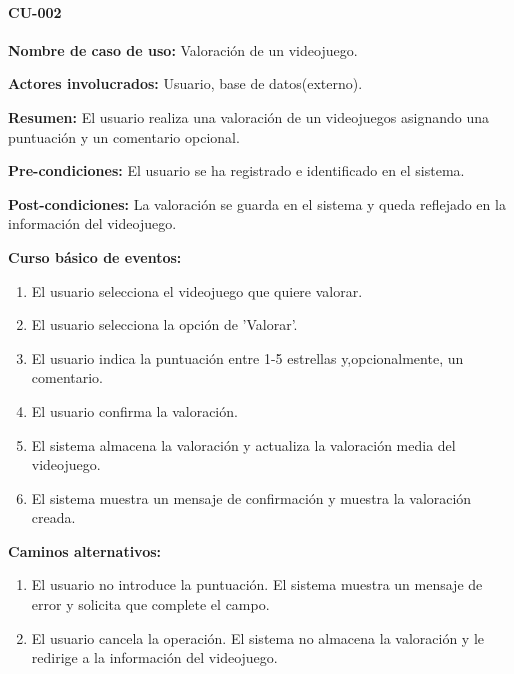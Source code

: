 \paragraph{CU-002}
\begin{description}
    \item \textbf{Nombre de caso de uso:} Valoración de un videojuego.
    \item \textbf{Actores involucrados:} Usuario, base de datos(externo).
    \item \textbf{Resumen:} El usuario realiza una valoración de un videojuegos asignando una puntuación 
    y un comentario opcional.
    \item \textbf{Pre-condiciones:} El usuario se ha registrado e identificado en el sistema.
    \item \textbf{Post-condiciones:} La valoración se guarda en el sistema y queda reflejado en la información 
    del videojuego.
    \item \textbf{Curso básico de eventos:} 
    \begin{enumerate}
            \item El usuario selecciona el videojuego que quiere valorar.
            \item El usuario selecciona la opción de 'Valorar'.
            \item El usuario indica la puntuación entre 1-5 estrellas y,opcionalmente, un comentario.
            \item El usuario confirma la valoración.
            \item El sistema almacena la valoración y actualiza la valoración media del videojuego.
            \item El sistema muestra un mensaje de confirmación y muestra la valoración creada.

    \end{enumerate}
    \item \textbf{Caminos alternativos:}
    \begin{enumerate}
        \item El usuario no introduce la puntuación. El sistema muestra un mensaje de error y solicita que 
        complete el campo.
        \item El usuario cancela la operación. El sistema no almacena la valoración y le redirige a la información 
        del videojuego. 
    \end{enumerate}
\end{description}

